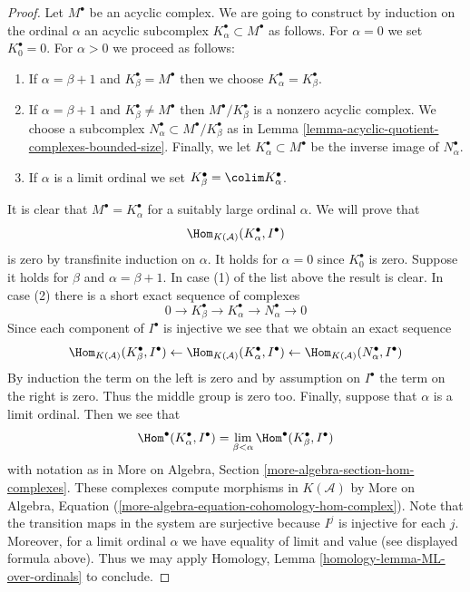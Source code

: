 \begin{proof}
Let $M^\bullet$ be an acyclic complex. We are going to construct by
induction on the ordinal $\alpha$ an acyclic subcomplex
$K_\alpha^\bullet \subset M^\bullet$ as follows.
For $\alpha = 0$ we set $K_0^\bullet = 0$. For $\alpha > 0$
we proceed as follows:
\begin{enumerate}
\item If $\alpha = \beta + 1$ and $K_\beta^\bullet = M^\bullet$
then we choose $K_\alpha^\bullet = K_\beta^\bullet$.
\item If $\alpha = \beta + 1$ and $K_\beta^\bullet \not = M^\bullet$
then $M^\bullet/K_\beta^\bullet$ is a nonzero acyclic complex.
We choose a subcomplex $N_\alpha^\bullet \subset M^\bullet/K_\beta^\bullet$
as in Lemma \ref{lemma-acyclic-quotient-complexes-bounded-size}.
Finally, we let $K_\alpha^\bullet \subset M^\bullet$
be the inverse image of $N_\alpha^\bullet$.
\item If $\alpha$ is a limit ordinal we set
$K_\beta^\bullet = \colim K_\alpha^\bullet$.
\end{enumerate}
It is clear that $M^\bullet = K_\alpha^\bullet$ for a suitably large
ordinal $\alpha$. We will prove that
$$
\Hom_{K(\mathcal{A})}(K_\alpha^\bullet, I^\bullet)
$$
is zero by transfinite induction on $\alpha$. It holds for $\alpha = 0$
since $K_0^\bullet$ is zero. Suppose it holds for $\beta$ and
$\alpha = \beta + 1$. In case (1) of the list above the result is clear.
In case (2) there is a short exact sequence of complexes
$$
0 \to K_\beta^\bullet \to K_\alpha^\bullet \to N_\alpha^\bullet \to 0
$$
Since each component of $I^\bullet$ is injective we see that we obtain
an exact sequence
$$
\Hom_{K(\mathcal{A})}(K_\beta^\bullet, I^\bullet) \leftarrow
\Hom_{K(\mathcal{A})}(K_\alpha^\bullet, I^\bullet) \leftarrow
\Hom_{K(\mathcal{A})}(N_\alpha^\bullet, I^\bullet)
$$
By induction the term on the left is zero and by assumption on $I^\bullet$
the term on the right is zero. Thus the middle group is zero too.
Finally, suppose that $\alpha$ is a limit ordinal. Then we see that
$$
\Hom^\bullet(K_\alpha^\bullet, I^\bullet) =
\lim_{\beta < \alpha} \Hom^\bullet(K_\beta^\bullet, I^\bullet)
$$
with notation as in
More on Algebra, Section \ref{more-algebra-section-hom-complexes}.
These complexes compute morphisms in $K(\mathcal{A})$ by
More on Algebra, Equation
(\ref{more-algebra-equation-cohomology-hom-complex}).
Note that the transition maps in the system are surjective
because $I^j$ is injective for each $j$. Moreover, for a limit
ordinal $\alpha$ we have equality of limit and value
(see displayed formula above). Thus we may apply
Homology, Lemma \ref{homology-lemma-ML-over-ordinals}
to conclude.
\end{proof}


